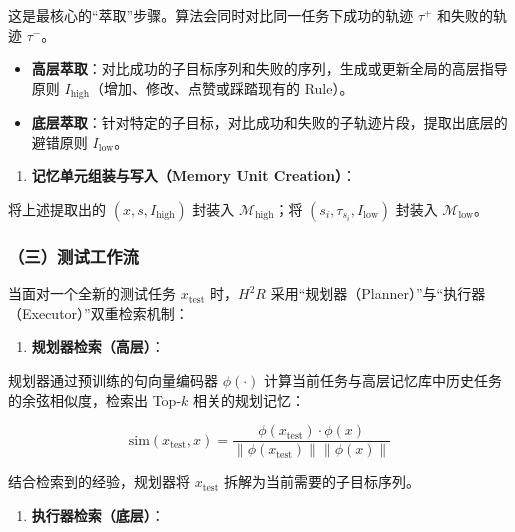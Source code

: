 这是最核心的``萃取''步骤。算法会同时对比同一任务下成功的轨迹 \(\tau^{+}\) 和失败的轨迹 \(\tau^{-}\)。

\begin{itemize}
\tightlist
\item
  \textbf{高层萃取}：对比成功的子目标序列和失败的序列，生成或更新全局的高层指导原则 \(I_{\mathrm{high}}\)（增加、修改、点赞或踩踏现有的 Rule）。
\item
  \textbf{底层萃取}：针对特定的子目标，对比成功和失败的子轨迹片段，提取出底层的避错原则 \(I_{\mathrm{low}}\)。
\end{itemize}

\begin{enumerate}
\def\labelenumi{\arabic{enumi}.}
\setcounter{enumi}{3}
\tightlist
\item
  \textbf{记忆单元组装与写入（Memory Unit Creation）}：
\end{enumerate}

将上述提取出的 \((x,s,I_{\mathrm{high}})\) 封装入 \(\mathcal{M}_{\mathrm{high}}\)；将 \((s_i,\tau_{s_i},I_{\mathrm{low}})\) 封装入 \(\mathcal{M}_{\mathrm{low}}\)。

\hypertarget{ux4e09ux6d4bux8bd5ux5de5ux4f5cux6d41}{%
\subsubsection{（三）测试工作流}\label{ux4e09ux6d4bux8bd5ux5de5ux4f5cux6d41}}

当面对一个全新的测试任务 \(x_{\mathrm{test}}\) 时，\(H^2R\) 采用``规划器（Planner）''与``执行器（Executor）''双重检索机制：

\begin{enumerate}
\def\labelenumi{\arabic{enumi}.}
\tightlist
\item
  \textbf{规划器检索（高层）}：
\end{enumerate}

规划器通过预训练的句向量编码器 \(\phi(\cdot)\) 计算当前任务与高层记忆库中历史任务的余弦相似度，检索出 Top-\(k\) 相关的规划记忆：

\[
\mathrm{sim}(x_{\mathrm{test}},x)=
\frac{\phi(x_{\mathrm{test}})\cdot\phi(x)}
{\|\phi(x_{\mathrm{test}})\|\|\phi(x)\|}
\]

结合检索到的经验，规划器将 \(x_{\mathrm{test}}\) 拆解为当前需要的子目标序列。

\begin{enumerate}
\def\labelenumi{\arabic{enumi}.}
\setcounter{enumi}{1}
\tightlist
\item
  \textbf{执行器检索（底层）}：
\end{enumerate}

